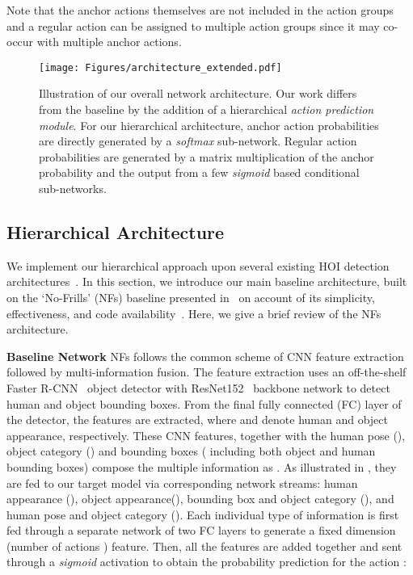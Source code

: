 Note that the anchor actions themselves are not included in the action groups and a regular action  can be assigned to multiple action groups since it may co-occur with multiple anchor actions.









  

\begin{figure*}[t]
\centering
\texttt{[image: Figures/architecture\_extended.pdf]}
    \vspace{-2mm}
    \caption{Illustration of our overall network architecture.
	Our work differs from the baseline \cite{gupta2019no} by the addition of a hierarchical \emph{action prediction module}.
	For our hierarchical architecture, anchor action probabilities are directly generated by a \emph{softmax} sub-network. Regular action probabilities are generated by a matrix multiplication of the anchor probability and the output from a few \emph{sigmoid} based conditional sub-networks.}
	\vspace{-2mm}
    \label{fig:model_merged}
\end{figure*}


\subsection{Hierarchical Architecture}
\label{sec.architecture}
We implement our hierarchical approach upon several existing HOI detection architectures~\cite{gao2020drg,gupta2019no,liao2020ppdm}.
In this section, we introduce our main baseline architecture, built on the `No-Frills' (NFs) baseline presented in~\cite{gupta2019no} on account of its simplicity, effectiveness, and code availability~\cite{nofrillsgit}.
Here, we give a brief review of the NFs architecture. 

\noindent\textbf{Baseline Network}
NFs follows the common scheme of CNN feature extraction followed by multi-information fusion. The feature extraction uses an off-the-shelf Faster R-CNN~\cite{ren2015faster} object detector with ResNet152~\cite{he2016deep} backbone network to detect human and object bounding boxes. From the final fully connected (FC) layer of the detector, the features  are extracted, where  and  denote human and object appearance, respectively. These CNN features, together with the human pose (), object category () and bounding boxes ( including both object and human bounding boxes) compose the multiple information as . As illustrated in , they are fed to our target model via corresponding network streams: human appearance (), object appearance(), bounding box and object category (), and human pose and object category (). Each individual type of information is first fed through a separate network of two FC layers to generate a fixed dimension (number of actions ) feature. Then, all the features are added together and sent through a \emph{sigmoid} activation to obtain the probability prediction for the action :


